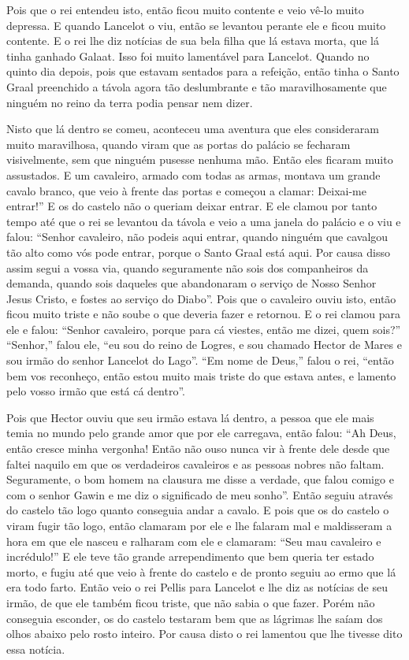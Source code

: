 Pois que o rei entendeu isto, então ficou muito contente e veio vê-lo muito
depressa. E quando Lancelot o viu, então se levantou perante ele e ficou muito
contente. E o rei lhe diz notícias de sua bela filha que lá estava morta, que
lá tinha ganhado Galaat. Isso foi muito lamentável para Lancelot. Quando no
quinto dia depois, pois que estavam sentados para a refeição, então tinha o
Santo Graal preenchido a távola agora tão deslumbrante e tão maravilhosamente
que ninguém no reino da terra podia pensar nem dizer. 

Nisto que lá dentro se comeu, aconteceu uma aventura que eles consideraram muito
maravilhosa, quando viram que as portas do palácio se fecharam visivelmente,
sem que ninguém pusesse nenhuma mão. Então eles ficaram muito assustados. E um
cavaleiro, armado com todas as armas, montava um grande cavalo branco, que veio
à frente das portas e começou a clamar: Deixai-me entrar!” E os do castelo não
o queriam deixar entrar. E ele clamou por tanto tempo até que o rei se levantou
da távola e veio a uma janela do palácio e o viu e falou: “Senhor cavaleiro,
não podeis aqui entrar, quando ninguém que cavalgou tão alto como vós pode
entrar, porque o Santo Graal está aqui. Por causa disso assim segui a vossa
via, quando seguramente não sois dos companheiros da demanda, quando sois
daqueles que abandonaram o serviço de Nosso Senhor Jesus Cristo, e fostes ao
serviço do Diabo”. Pois que o cavaleiro ouviu isto, então ficou muito triste e
não soube o que deveria fazer e retornou. E o rei clamou para ele e falou:
“Senhor cavaleiro, porque para cá viestes, então me dizei, quem sois?”
“Senhor,” falou ele, “eu sou do reino de Logres, e sou chamado Hector de Mares
e sou irmão do senhor Lancelot do Lago”. “Em nome de Deus,” falou o rei,
“então bem vos reconheço, então estou muito mais triste do que estava antes, e
lamento pelo vosso irmão que está cá dentro”. 

Pois que Hector ouviu que seu irmão estava lá dentro, a pessoa que ele mais
temia no mundo pelo grande amor que por ele carregava, então falou: “Ah Deus,
então cresce minha vergonha! Então não ouso nunca vir à frente dele desde que
faltei naquilo em que os verdadeiros cavaleiros e as pessoas nobres não faltam.
Seguramente, o bom homem na clausura me disse a verdade, que falou comigo e com
o senhor Gawin e me diz o significado de meu sonho”. Então seguiu através do
castelo tão logo quanto conseguia andar a cavalo. E pois que os do castelo o
viram fugir tão logo, então clamaram por ele e lhe falaram mal e maldisseram a
hora em que ele nasceu e ralharam com ele e clamaram: “Seu mau cavaleiro e
incrédulo!”  E ele teve tão grande arrependimento que bem queria ter estado
morto, e fugiu até que veio à frente do castelo e de pronto seguiu ao ermo que
lá era todo farto. Então veio o rei Pellis para Lancelot e lhe diz as notícias
de seu irmão, de que ele também ficou triste, que não sabia o que fazer. Porém
não conseguia esconder, os do castelo testaram bem que as lágrimas lhe saíam
dos olhos abaixo pelo rosto inteiro. Por causa disto o rei lamentou que lhe
tivesse dito essa notícia.

